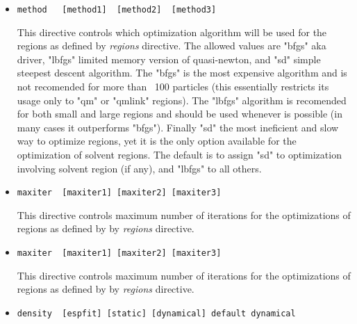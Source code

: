 \begin{itemize}
\item
\begin{verbatim}
method   [method1]  [method2]  [method3]
\end{verbatim}

This directive controls which optimization algorithm will be used for the regions as defined
by {\it regions} directive. The allowed values are "bfgs" aka driver, "lbfgs" limited memory version of quasi-newton,
and "sd" simple steepest descent algorithm. The "bfgs" is the most expensive algorithm and is not 
recomended for more than ~100 particles (this essentially restricts its usage only to "qm" or "qmlink" regions).
The "lbfgs" algorithm is recomended for both small and large regions and should be used whenever is possible (in many
cases it outperforms "bfgs"). Finally "sd" the most ineficient and slow way to optimize regions, yet it is the only option
available for the optimization of solvent regions. The default is to assign "sd" to optimization involving solvent region (if any),
and "lbfgs" to all others.



\item
\begin{verbatim}
maxiter  [maxiter1] [maxiter2] [maxiter3]
\end{verbatim}

This directive controls maximum number of iterations for the optimizations of regions as defined by
by {\it regions} directive. 



\item
\begin{verbatim}
maxiter  [maxiter1] [maxiter2] [maxiter3]
\end{verbatim}

This directive controls maximum number of iterations for the optimizations of regions as defined by
by {\it regions} directive. 


\item
\begin{verbatim}
density  [espfit] [static] [dynamical] default dynamical
\end{verbatim}


\end{itemize}
